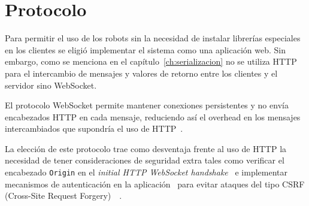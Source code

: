 
\chapter{Protocolo}
\label{ch:protocolo}

Para permitir el uso de los robots sin la necesidad de instalar librerías
especiales en los clientes se eligió implementar el sistema como una
aplicación web. Sin embargo, como se menciona en el
capítulo~\ref{ch:serializacion} no se utiliza HTTP para el intercambio de
mensajes y valores de retorno entre los clientes y el servidor sino
WebSocket.

El protocolo WebSocket permite mantener conexiones persistentes y no envía
encabezados HTTP en cada mensaje, reduciendo así el overhead en los mensajes
intercambiados que supondría el uso de HTTP~\cite{Wang}.

La elección de este protocolo trae como desventaja frente al uso de HTTP la
necesidad de tener consideraciones de seguridad extra tales como verificar
el encabezado \texttt{Origin} en el
\textit{initial HTTP WebSocket handshake}~\cite{Grigorik} e implementar
mecanismos de
autenticación en la aplicación~\cite{Wang} para evitar
ataques del tipo CSRF (Cross-Site Request
Forgery)~\cite{OWASP-2014}~\cite{Schneider-2013}.

